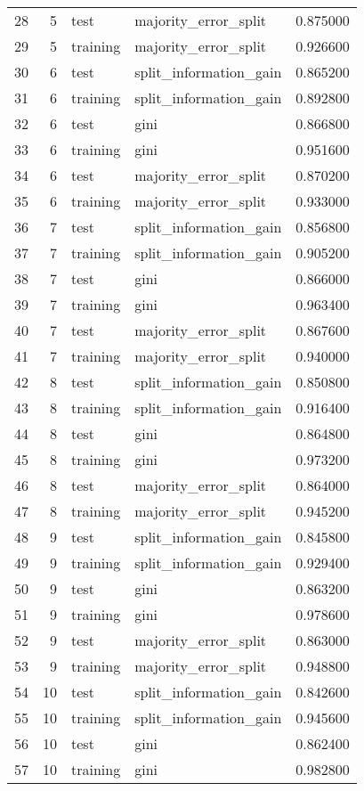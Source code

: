 \begin{tabular}{lrllr}
28 & 5 & test & majority_error_split & 0.875000 \\
29 & 5 & training & majority_error_split & 0.926600 \\
30 & 6 & test & split_information_gain & 0.865200 \\
31 & 6 & training & split_information_gain & 0.892800 \\
32 & 6 & test & gini & 0.866800 \\
33 & 6 & training & gini & 0.951600 \\
34 & 6 & test & majority_error_split & 0.870200 \\
35 & 6 & training & majority_error_split & 0.933000 \\
36 & 7 & test & split_information_gain & 0.856800 \\
37 & 7 & training & split_information_gain & 0.905200 \\
38 & 7 & test & gini & 0.866000 \\
39 & 7 & training & gini & 0.963400 \\
40 & 7 & test & majority_error_split & 0.867600 \\
41 & 7 & training & majority_error_split & 0.940000 \\
42 & 8 & test & split_information_gain & 0.850800 \\
43 & 8 & training & split_information_gain & 0.916400 \\
44 & 8 & test & gini & 0.864800 \\
45 & 8 & training & gini & 0.973200 \\
46 & 8 & test & majority_error_split & 0.864000 \\
47 & 8 & training & majority_error_split & 0.945200 \\
48 & 9 & test & split_information_gain & 0.845800 \\
49 & 9 & training & split_information_gain & 0.929400 \\
50 & 9 & test & gini & 0.863200 \\
51 & 9 & training & gini & 0.978600 \\
52 & 9 & test & majority_error_split & 0.863000 \\
53 & 9 & training & majority_error_split & 0.948800 \\
54 & 10 & test & split_information_gain & 0.842600 \\
55 & 10 & training & split_information_gain & 0.945600 \\
56 & 10 & test & gini & 0.862400 \\
57 & 10 & training & gini & 0.982800 \\

\end{tabular}
